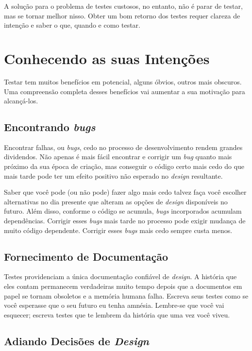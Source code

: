 A solução para o problema de testes custosos, no entanto, não é parar de testar, mas se tornar melhor nisso. Obter um bom retorno dos testes requer clareza de intenção e saber o que, quando e como testar.

\section{Conhecendo as suas Intenções}

Testar tem muitos benefícios em potencial, alguns óbvios, outros mais obscuros. Uma compreensão completa desses benefícios vai aumentar a sua motivação para alcançá-los.

\subsection{Encontrando \textit{bugs}}

Encontrar falhas, ou \textit{bugs}, cedo no processo de desenvolvimento rendem grandes dividendos. Não apenas é mais fácil encontrar e corrigir um \textit{bug} quanto mais próximo da sua época de criação, mas conseguir o código certo mais cedo do que mais tarde pode ter um efeito positivo não esperado no \textit{design} resultante.

Saber que você pode (ou não pode) fazer algo mais cedo talvez faça você escolher alternativas no dia presente que alteram as opções de \textit{design} disponíveis no futuro. Além disso, conforme o código se acumula, \textit{bugs} incorporados acumulam dependências. Corrigir esses \textit{bugs} mais tarde no processo pode exigir mudança de muito código dependente. Corrigir esses \textit{bugs} mais cedo sempre custa menos.

\subsection{Fornecimento de Documentação}

Testes providenciam a única documentação confiável de \textit{design}. A história que eles contam permanecem verdadeiras muito tempo depois que a documentos em papel se tornam obsoletos e a memória humana falha. Escreva seus testes como se você esperasse que o seu futuro eu tenha amnésia. Lembre-se que você vai esquecer; escreva testes que te lembrem da história que uma vez você viveu.

\subsection{Adiando Decisões de \textit{Design}}

